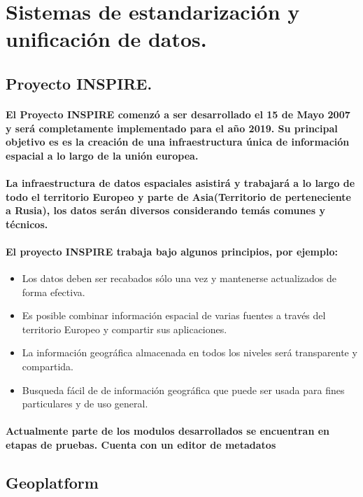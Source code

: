 \section{Sistemas de estandarización y unificación de datos.}
  \subsection{Proyecto INSPIRE.}
    \paragraph{El Proyecto INSPIRE comenzó a ser desarrollado el 15 de Mayo 2007 y será completamente implementado para el año 2019. Su principal objetivo es es la creación de una infraestructura única de información espacial a lo largo de la unión europea.} 
    \paragraph{La infraestructura de datos espaciales asistirá y trabajará a lo largo de todo el territorio Europeo y parte de Asia(Territorio de perteneciente a Rusia), los datos serán diversos considerando temás comunes y técnicos.}
    \paragraph{El proyecto INSPIRE trabaja bajo algunos principios, por ejemplo:}
    \begin{itemize}
      \item Los datos deben ser recabados sólo una vez y mantenerse actualizados de forma efectiva.
      \item Es posible combinar información espacial de varias fuentes a través del territorio Europeo y compartir sus aplicaciones.
      \item La información geográfica almacenada en todos los niveles será transparente y compartida.
      \item Busqueda fácil de de información geográfica que puede ser usada para fines particulares y de uso general.
    \end{itemize}
    \paragraph{Actualmente parte de los modulos desarrollados se encuentran en etapas de pruebas. Cuenta con un editor de metadatos }
  \subsection{Geoplatform}
